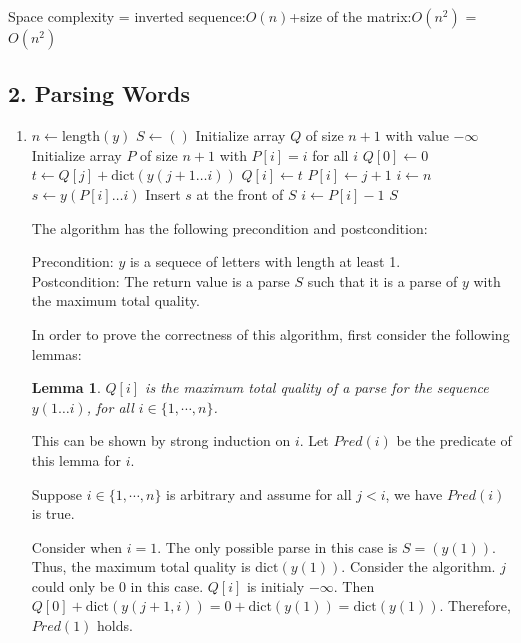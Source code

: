 \documentclass[10pt]{article}
\newtheorem{lemma}[theorem]{Lemma}
\begin{document}
Space complexity = inverted sequence:$O(n)$+size of the
matrix:$O(n^2)$ = $O(n^2)$


\subsection*{2. Parsing Words}
\begin{enumerate}[label=(\alph*)]
  \item
    \begin{algorithmic}[1]
        \State $n \gets \mbox{length}(y)$
        \State $S \gets ()$
        \State Initialize array $Q$ of size $n+1$ with value $-\infty$
        \State Initialize array $P$ of size $n+1$ with $P[i] = i$ for all $i$
        \State $Q[0] \gets 0$
            \State $t \gets Q[j] + \mbox{dict}(y(j+1 \ldots i))$
              \State $Q[i] \gets t$
              \State $P[i] \gets j+1$
            \EndIf
          \EndFor
        \EndFor
        \State $i \gets n$
          \State $s \gets y(P[i] \ldots i)$
          \State Insert $s$ at the front of $S$
          \State $i \gets P[i]-1$
        \EndWhile
       \State \Return $S$
      \EndFunction
    \end{algorithmic}

    The algorithm has the following precondition and postcondition:

    Precondition: $y$ is a sequece of letters with length at least 1. \\
    Postcondition: The return value is a parse $S$ such that it is a parse of
    $y$ with the maximum total quality. 

    In order to prove the correctness of this algorithm, first consider the
    following lemmas:

    \begin{lemma}
      $Q[i]$ is the maximum total quality of a parse for the sequence $y(1
      \ldots i)$, for all $i \in \{1, \cdots, n\}$.
    \end{lemma}
    \begin{addmargin}[1em]{0em}
      This can be shown by strong induction on $i$.
      Let $Pred(i)$ be the predicate of this lemma for $i$.

      Suppose $i \in \{1, \cdots, n\}$ is arbitrary and assume for all $j < i$,
      we have $Pred(i)$ is true. 

      Consider when $i = 1$. 
      The only possible parse in this case is $S = (y(1))$.
      Thus, the maximum total quality is $\mbox{dict}(y(1))$.
      Consider the algorithm.
      $j$ could only be 0 in this case. 
      $Q[i]$ is initialy $-\infty$. 
      Then $Q[0] + \mbox{dict}(y(j+1, i)) = 0 + \mbox{dict}(y(1)) =
      \mbox{dict}(y(1))$. 
      Therefore, $Pred(1)$ holds.


\end{addmargin}
\end{enumerate}
\end{document}
